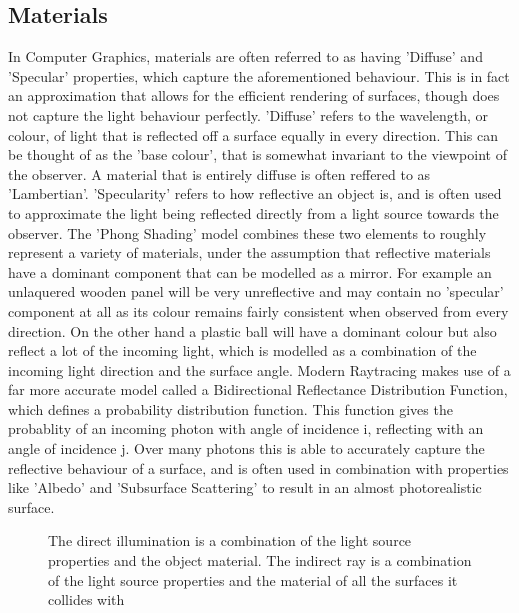 \documentclass[ %
                    author={Gavin Parker},
                supervisor={Dr. Neill Campbell},
                    degree={MEng},
                     title={Deep Siamese Networks for Illumination Estimation from Stereo Images},
                  subtitle={},
                      type={research},
                      year={2018} ]{dissertation}
\begin{document}
\subsection{Materials}
In Computer Graphics, materials are often referred to as having 'Diffuse' and 'Specular' properties, which capture the aforementioned behaviour. This is in fact an approximation that allows for the efficient rendering of surfaces, though does not capture the light behaviour perfectly. 'Diffuse' refers to the wavelength, or colour, of light that is reflected off a surface equally in every direction. This can be thought of as the 'base colour', that is somewhat invariant to the viewpoint of the observer. A material that is entirely diffuse is often reffered to as 'Lambertian'. 'Specularity' refers to how reflective an object is, and is often used to approximate the light being reflected directly from a light source towards the observer. The 'Phong Shading' model combines these two elements to roughly represent a variety of materials, under the assumption that reflective materials have a dominant component that can be modelled as a mirror. For example an unlaquered wooden panel will be very unreflective and may contain no 'specular' component at all as its colour remains fairly consistent when observed from every direction. On the other hand a plastic ball will have a dominant colour but also reflect a lot of the incoming light, which is modelled as a combination of the incoming light direction and the surface angle. Modern Raytracing makes use of a far more accurate model called a Bidirectional Reflectance Distribution Function, which defines a probability distribution function. This function gives the probablity of an incoming photon with angle of incidence i, reflecting with an angle of incidence j. Over many photons this is able to accurately capture the reflective behaviour of a surface, and is often used in combination with properties like 'Albedo' and 'Subsurface Scattering' to result in an almost photorealistic surface.
\begin{center}
\begin{figure}
\centering
{}
\label{raytracing}
\caption{The direct illumination is a combination of the light source properties and the object material. The indirect ray is a combination of the light source properties and the material of all the surfaces it collides with}
\end{figure}
\end{center}
\end{document}

